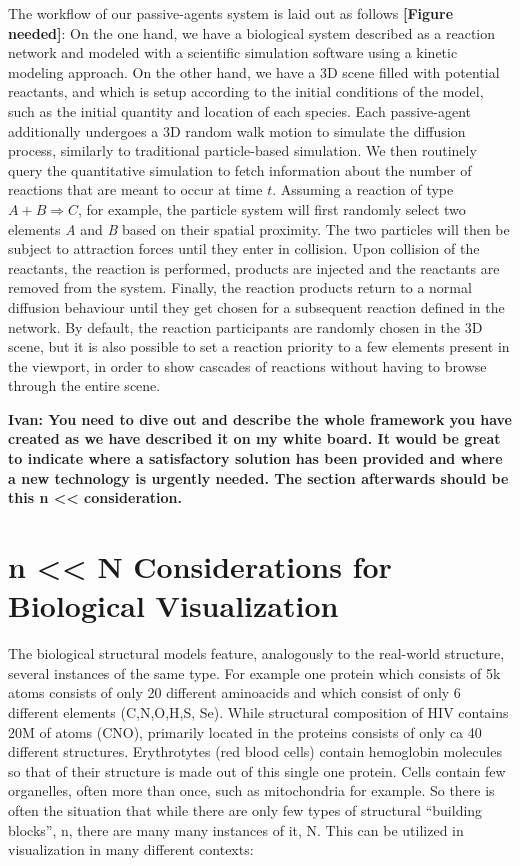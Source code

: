 The workflow of our passive-agents system is laid out as follows \textbf{[Figure needed]}:
On the one hand, we have a biological system described as a reaction network and modeled with a scientific simulation software using a kinetic modeling approach.
On the other hand, we have a 3D scene filled with potential reactants, and which is setup according to the initial conditions of the model, such as the initial quantity and location of each species.
Each passive-agent additionally undergoes a 3D random walk motion to simulate the diffusion process, similarly to traditional particle-based simulation.
We then routinely query the quantitative simulation to fetch information about the number of reactions that are meant to occur at time $t$.
Assuming a reaction of type $A + B \Rightarrow C$, for example, the particle system will first randomly select two elements \textit{A} and \textit{B} based on their spatial proximity.
The two particles will then be subject to attraction forces until they enter in collision.
Upon collision of the reactants, the reaction is performed, products are injected and the reactants are removed from the system.
Finally, the reaction products return to a normal diffusion behaviour until they get chosen for a subsequent reaction defined in the network.
By default, the reaction participants are randomly chosen in the 3D scene, but it is also possible to set a reaction priority to a few elements present in the viewport, in order to show cascades of reactions without having to browse through the entire scene.

\textbf{Ivan: You need to dive out and describe the whole framework you have created as we have described it on my white board.
	It would be great to indicate where a satisfactory solution has been provided and where a new technology is urgently needed.
	The section afterwards should be this n << consideration.}

\section{n << N Considerations for Biological Visualization}

The biological structural models feature, analogously to the real-world structure, several instances of the same type. For example one protein which consists of 5k atoms consists of only 20 different aminoacids and which consist of only 6 different elements (C,N,O,H,S, Se). While structural composition of HIV contains 20M of atoms (CNO), primarily located in the proteins consists of only ca 40 different structures. Erythrotytes (red blood cells) contain hemoglobin molecules so that  of their structure is made out of this single one protein. Cells contain few organelles, often more than once, such as mitochondria for example. So there is often the situation that while there are only few types of structural “building blocks”, n, there are many many instances of it, N. This can be utilized in visualization in many different contexts:

